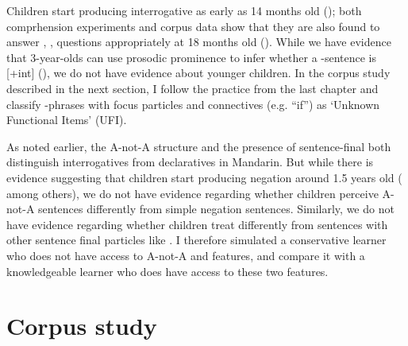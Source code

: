  Children start producing interrogative \twh{} as early as 14 months old (\cite{lee1989acq, fan2012, linjing2014}); both comprhension experiments and corpus data show that they are also found to answer , ,  questions appropriately at 18 months old (\citealt{fan2012,moradlou2020}). While we have evidence that 3-year-olds can use prosodic prominence to infer whether a \twh-sentence is [+int] (\cite{WHanything}), we do not have evidence about younger children. In the corpus study described in the next section, I follow the practice from the last chapter and classify \twh-phrases with focus particles and connectives (e.g.  ``if'') as `Unknown Functional Items' (UFI).

 As noted earlier, the A-not-A structure and the presence of sentence-final  both distinguish interrogatives from declaratives in Mandarin. But while there is evidence suggesting that children start producing negation around 1.5 years old (\cite{lee1982neg,fan2007,li2019neg, huang2022manchild} among others), we do not have evidence regarding whether children perceive A-not-A sentences differently from simple negation sentences. Similarly, we do not have evidence regarding whether children treat  differently from sentences with other sentence final particles like . I therefore simulated a conservative learner who does not have access to A-not-A and  features, and compare it with a knowledgeable learner who does have access to these two features. 





\section{Corpus study}
\label{sec:mancl:corpus}


